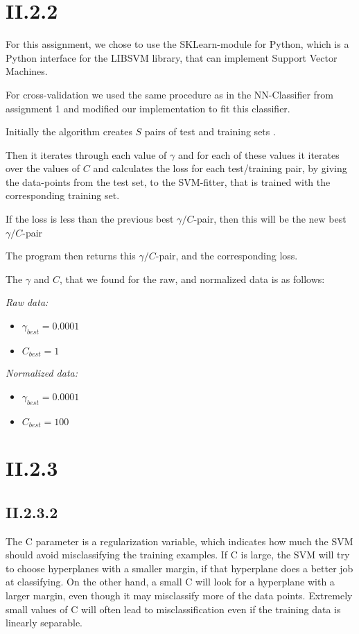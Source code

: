 \documentclass[12pt, a4paper]{article}
\begin{document}
\section{II.2.2}
For this assignment, we chose to use the SKLearn-module for Python, which is a Python interface for the LIBSVM library, that can implement Support Vector Machines.

For cross-validation we used the same procedure as in the NN-Classifier from assignment 1 and modified our implementation to fit this classifier.

Initially the algorithm creates $S$ pairs of test and training sets .

Then it iterates through each value of $\gamma$ and for each of these values it iterates over the values of $C$ and calculates the loss for each test/training pair, by giving the data-points from the test set, to the SVM-fitter, that is trained with the corresponding training set.

If the loss is less than the previous best $\gamma/C$-pair, then this will be the new best $\gamma/C$-pair

The program then returns this $\gamma/C$-pair, and the corresponding loss.

The $\gamma$ and $C$, that we found for the raw, and normalized data is as follows:

\textit{Raw data:}
\begin{itemize}
	\item $\gamma_{best} = 0.0001$
	\item $C_{best} = 1$
\end{itemize}

\textit{Normalized data:}
\begin{itemize}
	\item $\gamma_{best} = 0.0001$
	\item $C_{best} = 100$
\end{itemize}


\section{II.2.3}

\subsection{II.2.3.2}

The C parameter is a regularization variable, which indicates how much the SVM should avoid misclassifying the training examples. If C is large, the SVM will try to choose hyperplanes with a smaller margin, if that hyperplane does a better job at classifying. On the other hand, a small C will look for a hyperplane with a larger margin, even though it may misclassify more of the data points. Extremely small values of C will often lead to misclassification even if the training data is linearly separable.
\end{document}
